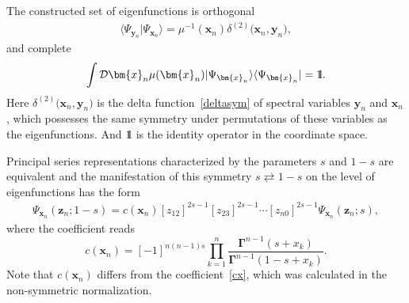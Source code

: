 \documentclass[pdftex]{sigma}
\newcommand{\II}{\hbox{{1}\kern-.25em\hbox{l}}}
\numberwithin{equation}{section}
\begin{document}
The constructed set of eigenfunctions is orthogonal
\begin{align*}
\langle\Psi_{\bm{y}_n}|\Psi_{\bm{x}_n}\rangle = \mu^{-1}(\bm{x}_n)
\delta^{(2)}\bigl(\bm{x}_n,\bm{y}_n \bigr) ,
\end{align*}
and complete
\begin{equation*}
\int \mathcal{D}\bm{x}_n \mu(\bm{x}_n)
|\Psi_{\bm{x}_n}\rangle \langle\Psi_{\bm{x}_n}| = \II .
\end{equation*}
Here $\delta^{(2)}\bigl(\bm{x}_n,\bm{y}_n \bigr)$ is the delta function~\eqref{deltasym} of spectral variables $\bm{y}_n$ and $\bm{x}_n$, which possesses the same symmetry under permutations of these variables as the eigenfunctions. And $\II$ is the identity operator in the coordinate space.

Principal series representations characterized by the
parameters $s$ and $1-s$ are equivalent and the manifestation
of this symmetry $s \rightleftarrows 1-s$ on the level of eigenfunctions
has the form
\begin{align*}
\Psi_{\bm x_n}(\bm z_n;1-s) = c(\bm{x}_n)
[z_{12}]^{2s-1} [z_{23}]^{2s-1}
\cdots [z_{n0}]^{2s-1} \Psi_{\bm x_n}(\bm z_n;s) ,
\end{align*}
where the coefficient reads
\begin{equation*}
	c(\bm{x}_n) = [-1]^{n(n-1)s} \prod\limits_{k=1}^n \frac{\mathbf{\Gamma}^{n-1}(s+x_k)}{\mathbf{\Gamma}^{n-1}(1-s+x_k)} .
\end{equation*}
Note that $c(\bm{x}_n)$ differs from the coefficient~\eqref{cx}, which was calculated in the non-symmetric normalization.
\end{document}
